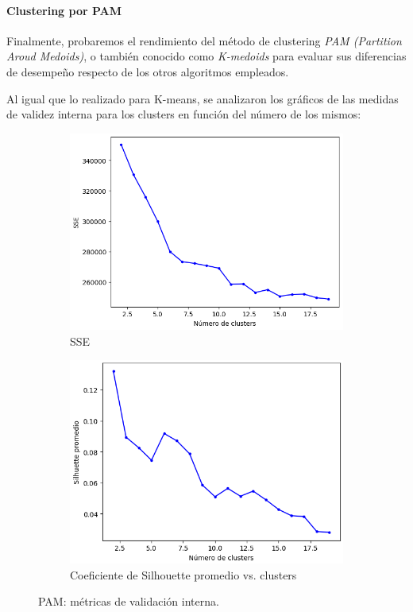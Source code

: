 \documentclass{article}
\begin{document}
\paragraph{Clustering por PAM}
Finalmente, probaremos el rendimiento del método de clustering \textit{PAM (Partition Aroud Medoids)}, o también conocido como \textit{K-medoids} para evaluar sus diferencias de desempeño respecto de los otros algoritmos empleados.

Al igual que lo realizado para K-means, se analizaron los gráficos de las medidas de validez interna para los clusters en función del número de los mismos: 

\begin{figure} [!htb]
	\centering
	\begin{subfigure}[b]{0.45\textwidth}
		\includegraphics[width= \textwidth]{fg/PAM_sse.png}
        \caption{SSE}
		\label{fg_pam_valint_sse}
	\end{subfigure}
	\begin{subfigure}[b]{0.45\textwidth}
		\includegraphics[width= \textwidth]{fg/PAM_silhouette.png}
        \caption{Coeficiente de Silhouette promedio vs. clusters}
        \label{fg_pam_valint_silhouette}
	\end{subfigure}
	\caption{PAM: métricas de validación interna.}	
\end{figure}
\end{document}
